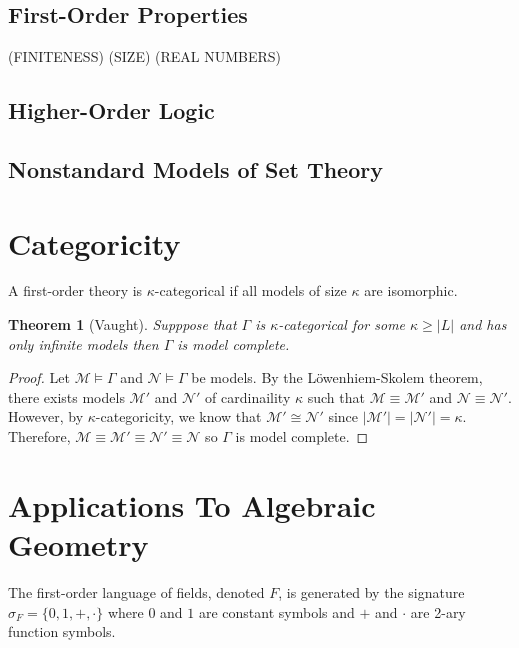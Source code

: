 \documentclass[12pt]{article}
\newcommand{\entails}{\models}
\newcommand{\Mmod}{\mathcal{M}}
\newcommand{\Nmod}{\mathcal{N}}
\newenvironment{definition}[1][Definition:]{\begin{trivlist}
\item[\hskip \labelsep {\bfseries #1}]}{\end{trivlist}}
\theoremstyle{theorem}
\newtheorem{theorem}{Theorem}[section]
\theoremstyle{definition}
\theoremstyle{definition}
\theoremstyle{remark}
\theoremstyle{definition}
\theoremstyle{remark}
\begin{document}
\subsection{First-Order Properties}

(FINITENESS)
(SIZE)
(REAL NUMBERS)

\subsection{Higher-Order Logic}

\subsection{Nonstandard Models of Set Theory}


\section{Categoricity}

\begin{definition}
A first-order theory is $\kappa$-categorical if all models of size $\kappa$ are isomorphic.
\end{definition}

\begin{theorem}[Vaught]
Supppose that $\Gamma$ is $\kappa$-categorical for some $\kappa \ge |L|$ and has only infinite models then $\Gamma$ is model complete.
\end{theorem}

\begin{proof}
Let $\Mmod \entails \Gamma$ and $\Nmod \entails \Gamma$ be models. By the L\"{o}wenhiem-Skolem theorem, there exists models $\Mmod'$ and $\Nmod'$ of cardinaility $\kappa$ such that $\Mmod \equiv \Mmod'$ and $\Nmod \equiv \Nmod'$. However, by $\kappa$-categoricity, we know that $\Mmod' \cong \Nmod'$ since $|\Mmod'| = |\Nmod'| = \kappa$. Therefore, $\Mmod \equiv \Mmod' \equiv \Nmod' \equiv \Nmod$ so $\Gamma$ is model complete.  
\end{proof}


\section{Applications To Algebraic Geometry}

\newcommand{\ACF}[1]{\mathrm{ACF}_{#1}}

\begin{definition}
The first-order language of fields, denoted $F$, is generated by the signature $\sigma_F = \{0,1,+,\cdot\}$ where $0$ and $1$ are constant symbols and $+$ and $\cdot$ are 2-ary function symbols. 
\end{definition}
\end{document}
